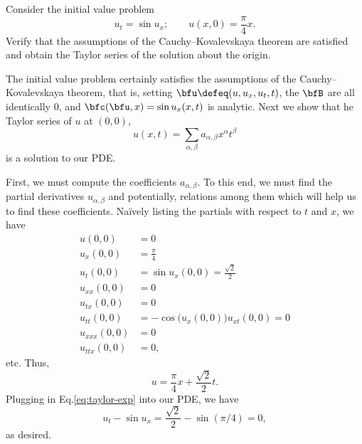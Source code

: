 \begin{problem}
  Consider the initial value problem
  \[
    u_t=\sin u_x;\qquad u(x,0)=\frac{\pi}{4}x.
  \]
  Verify that the assumptions of the Cauchy--Kovalevskaya theorem are
  satisfied and obtain the Taylor series of the solution about the origin.
\end{problem}
\begin{solution}
  The initial value problem certainly satisfies the assumptions of the
  Cauchy--Kovalevskaya theorem, that is, setting
  \(\bfu\defeq(u,u_x,u_t,t)\), the \(\bfB\) are all identically \(0\), and
  \(\bfc(\bfu,x)=\sin u_x(x,t)\) is analytic. Next we show that he Taylor
  series of \(u\) at \((0,0)\),
  \[
    u(x,t)=\sum_{\alpha,\beta} a_{\alpha,\beta} x^\alpha t^\beta
  \]
  is a solution to our PDE.

  First, we must compute the coefficients \(a_{\alpha,\beta}\). To this
  end, we must find the partial derivatives \(u_{\alpha,\beta}\) and
  potentially, relations among them which will help us to find these
  coefficients. Naïvely listing the partials with respect to \(t\) and
  \(x\), we have
  \begin{align*}
    u(0,0)&=0\\
    u_x(0,0)&=\frac{\pi}{4}\\
    u_t(0,0)&=\sin u_x(0,0)=\frac{\sqrt{2}}{2}\\
    u_{xx}(0,0)&=0\\
    u_{tx}(0,0)&=0\\
    u_{tt}(0,0)&=-\cos\bigl(u_x(0,0)\bigr)u_{xt}(0,0)=0\\
    u_{xxx}(0,0)&=0\\
    u_{ttx}(0,0)&=0,
  \end{align*}
  etc. Thus,
  \begin{equation}
    \label{eq:taylor-exp}
    u=\frac{\pi}{4}x+\frac{\sqrt{2}}{2}t.
  \end{equation}
  Plugging in Eq.\@ \eqref{eq:taylor-exp} into our PDE, we have
  \[
    u_t-\sin u_x=\frac{\sqrt{2}}{2}-\sin(\pi/4)=0,
  \]
  as desired.
\end{solution}
\newpage

